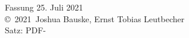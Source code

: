 \documentclass[a4paper,12pt,
headsepline,           %
oneside,               %
pointlessnumbers,      %
bibtotoc,              %
BCOR15mm               %
]{scrbook}
\newcommand{\fullname}{Joshua Bauske, Ernst Tobias Leutbecher}
\newcommand{\jahr}{2021}
\newcommand{\matnr}{}
\begin{document}
\clearpage
\thispagestyle{empty}
{ \small
  \flushleft
  Fassung 25. Juli 2021 \\\vfill
  \copyright~\jahr~\fullname\\[0.5em]
  Satz: PDF-\LaTeXe
}


\tableofcontents

\mainmatter
%





\appendix


\backmatter

\printbibliography

\clearpage
%
%
%
%
%
\end{document}
